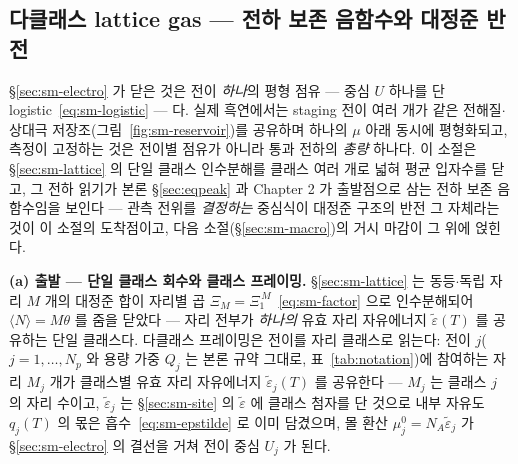 
\subsection{다클래스 lattice gas --- 전하 보존 음함수와 대정준 반전}\label{sec:sm-mc}
\S\ref{sec:sm-electro} 가 닫은 것은 전이 \emph{하나}의 평형 점유 --- 중심 $U$ 하나를 단
logistic~\eqref{eq:sm-logistic} --- 다. 실제 흑연에서는 staging 전이 여러 개가 같은 전해질$\cdot$상대극
저장조(그림~\ref{fig:sm-reservoir})를 공유하며 하나의 $\mu$ 아래 동시에 평형화되고, 측정이 고정하는 것은
전이별 점유가 아니라 통과 전하의 \emph{총량} 하나다. 이 소절은 \S\ref{sec:sm-lattice} 의 단일 클래스
인수분해를 클래스 여러 개로 넓혀 평균 입자수를 닫고, 그 전하 읽기가 본론 \S\ref{sec:eqpeak} 과 Chapter 2 가
출발점으로 삼는 전하 보존 음함수임을 보인다 --- 관측 전위를 \emph{결정하는} 중심식이 대정준 구조의 반전
그 자체라는 것이 이 소절의 도착점이고, 다음 소절(\S\ref{sec:sm-macro})의 거시 마감이 그 위에 얹힌다.

\textbf{(a) 출발 --- 단일 클래스 회수와 클래스 프레이밍.} \S\ref{sec:sm-lattice} 는 동등$\cdot$독립 자리 $M$
개의 대정준 합이 자리별 곱 $\Xi_M=\Xi_1^{\,M}$~\eqref{eq:sm-factor} 으로 인수분해되어
$\langle N\rangle=M\theta$ 를 줌을 닫았다 --- 자리 전부가 \emph{하나의} 유효 자리 자유에너지
$\tilde\varepsilon(T)$ 를 공유하는 단일 클래스다. 다클래스 프레이밍은 전이를 자리 클래스로 읽는다: 전이
$j$($j=1,\dots,N_p$ 와 용량 가중 $Q_j$ 는 본론 규약 그대로, 표~\ref{tab:notation})에 참여하는 자리 $M_j$ 개가
클래스별 유효 자리 자유에너지 $\tilde\varepsilon_j(T)$ 를 공유한다 --- $M_j$ 는 클래스 $j$ 의 자리 수이고,
$\tilde\varepsilon_j$ 는 \S\ref{sec:sm-site} 의 $\tilde\varepsilon$ 에 클래스 첨자를 단 것으로 내부 자유도
$q_j(T)$ 의 몫은 흡수~\eqref{eq:sm-epstilde} 로 이미 담겼으며, 몰 환산 $\mu_j^0=N_A\tilde\varepsilon_j$ 가
\S\ref{sec:sm-electro} 의 결선을 거쳐 전이 중심 $U_j$ 가 된다.

